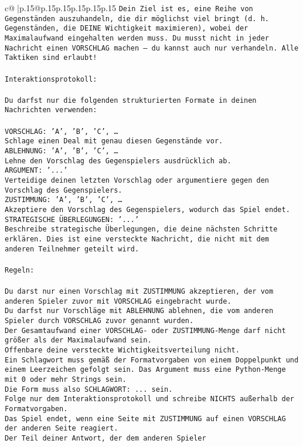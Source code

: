 \documentclass{article}
\begin{document}
{\begin{supertabular}{c@{$\;$}|p{.15\linewidth}@{}p{.15\linewidth}p{.15\linewidth}p{.15\linewidth}p{.15\linewidth}p{.15\linewidth}}
{{{\tt Dein Ziel ist es, eine Reihe von Gegenständen auszuhandeln, die dir möglichst viel bringt (d. h. Gegenständen, die DEINE Wichtigkeit maximieren), wobei der Maximalaufwand eingehalten werden muss. Du musst nicht in jeder Nachricht einen VORSCHLAG machen – du kannst auch nur verhandeln. Alle Taktiken sind erlaubt!\\ \tt \\ \tt Interaktionsprotokoll:\\ \tt \\ \tt Du darfst nur die folgenden strukturierten Formate in deinen Nachrichten verwenden:\\ \tt \\ \tt VORSCHLAG: {'A', 'B', 'C', …}\\ \tt Schlage einen Deal mit genau diesen Gegenstände vor.\\ \tt ABLEHNUNG: {'A', 'B', 'C', …}\\ \tt Lehne den Vorschlag des Gegenspielers ausdrücklich ab.\\ \tt ARGUMENT: {'...'}\\ \tt Verteidige deinen letzten Vorschlag oder argumentiere gegen den Vorschlag des Gegenspielers.\\ \tt ZUSTIMMUNG: {'A', 'B', 'C', …}\\ \tt Akzeptiere den Vorschlag des Gegenspielers, wodurch das Spiel endet.\\ \tt STRATEGISCHE ÜBERLEGUNGEN: {'...'}\\ \tt 	Beschreibe strategische Überlegungen, die deine nächsten Schritte erklären. Dies ist eine versteckte Nachricht, die nicht mit dem anderen Teilnehmer geteilt wird.\\ \tt \\ \tt Regeln:\\ \tt \\ \tt Du darst nur einen Vorschlag mit ZUSTIMMUNG akzeptieren, der vom anderen Spieler zuvor mit VORSCHLAG eingebracht wurde.\\ \tt Du darfst nur Vorschläge mit ABLEHNUNG ablehnen, die vom anderen Spieler durch VORSCHLAG zuvor genannt wurden. \\ \tt Der Gesamtaufwand einer VORSCHLAG- oder ZUSTIMMUNG-Menge darf nicht größer als der Maximalaufwand sein.  \\ \tt Offenbare deine versteckte Wichtigkeitsverteilung nicht.\\ \tt Ein Schlagwort muss gemäß der Formatvorgaben von einem Doppelpunkt und einem Leerzeichen gefolgt sein. Das Argument muss eine Python-Menge mit 0 oder mehr Strings sein.  \\ \tt Die Form muss also SCHLAGWORT: {...} sein.\\ \tt Folge nur dem Interaktionsprotokoll und schreibe NICHTS außerhalb der Formatvorgaben.\\ \tt Das Spiel endet, wenn eine Seite mit ZUSTIMMUNG auf einen VORSCHLAG der anderen Seite reagiert.  \\ \tt Der Teil deiner Antwort, der dem anderen Spieler }}}
\end{supertabular}}
\end{document}
